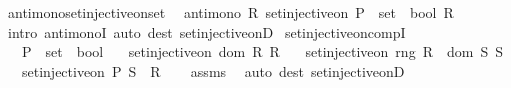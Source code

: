 \begin{isabellebody}
\endisatagproof
{\isafoldproof}%
%
\isadelimproof
\isanewline
%
\endisadelimproof
\isanewline
{}\isamarkupfalse%
\ antimono{\isacharunderscore}{\kern0pt}set{\isacharunderscore}{\kern0pt}injective{\isacharunderscore}{\kern0pt}on{\isacharunderscore}{\kern0pt}set{\isacharcolon}{\kern0pt}\isanewline
\ \ {\isachardoublequoteopen}antimono\ {\isacharparenleft}{\kern0pt}{\isasymlambda}R{\isachardot}{\kern0pt}\ set{\isacharunderscore}{\kern0pt}injective{\isacharunderscore}{\kern0pt}on\ {\isacharparenleft}{\kern0pt}P\ {\isacharcolon}{\kern0pt}{\isacharcolon}{\kern0pt}\ set\ {\isasymRightarrow}\ bool{\isacharparenright}{\kern0pt}\ R{\isacharparenright}{\kern0pt}{\isachardoublequoteclose}\isanewline
%
\isadelimproof
\ \ %
\endisadelimproof
%
\isatagproof
{}\isamarkupfalse%
\ {\isacharparenleft}{\kern0pt}intro\ antimonoI{\isacharparenright}{\kern0pt}\ {\isacharparenleft}{\kern0pt}auto\ dest{\isacharcolon}{\kern0pt}\ set{\isacharunderscore}{\kern0pt}injective{\isacharunderscore}{\kern0pt}onD{\isacharparenright}{\kern0pt}%
\endisatagproof
{\isafoldproof}%
%
\isadelimproof
\isanewline
%
\endisadelimproof
\isanewline
{}\isamarkupfalse%
\ set{\isacharunderscore}{\kern0pt}injective{\isacharunderscore}{\kern0pt}on{\isacharunderscore}{\kern0pt}compI{\isacharcolon}{\kern0pt}\isanewline
\ \ \ P\ {\isacharcolon}{\kern0pt}{\isacharcolon}{\kern0pt}\ {\isachardoublequoteopen}set\ {\isasymRightarrow}\ bool{\isachardoublequoteclose}\isanewline
\ \ \ {\isachardoublequoteopen}set{\isacharunderscore}{\kern0pt}injective{\isacharunderscore}{\kern0pt}on\ {\isacharparenleft}{\kern0pt}dom\ R{\isacharparenright}{\kern0pt}\ R{\isachardoublequoteclose}\isanewline
\ \ \ {\isachardoublequoteopen}set{\isacharunderscore}{\kern0pt}injective{\isacharunderscore}{\kern0pt}on\ {\isacharparenleft}{\kern0pt}rng\ R\ {\isasyminter}\ dom\ S{\isacharparenright}{\kern0pt}\ S{\isachardoublequoteclose}\isanewline
\ \ \ {\isachardoublequoteopen}set{\isacharunderscore}{\kern0pt}injective{\isacharunderscore}{\kern0pt}on\ P\ {\isacharparenleft}{\kern0pt}S\ {\isasymcirc}\ R{\isacharparenright}{\kern0pt}{\isachardoublequoteclose}\isanewline
%
\isadelimproof
\ \ %
\endisadelimproof
%
\isatagproof
{}\isamarkupfalse%
\ assms\ \isamarkupfalse%
\ {\isacharparenleft}{\kern0pt}auto\ dest{\isacharcolon}{\kern0pt}\ set{\isacharunderscore}{\kern0pt}injective{\isacharunderscore}{\kern0pt}onD{\isacharparenright}{\kern0pt}%
\endisatagproof
{\isafoldproof}%
%
\isadelimproof
\isanewline
%
\endisadelimproof
\isanewline
%
\isadelimtheory
\isanewline
%
\endisadelimtheory
%
\isatagtheory
{}\isamarkupfalse%
%
\endisatagtheory
{\isafoldtheory}%
%
\isadelimtheory
%
\endisadelimtheory
%
\end{isabellebody}%
